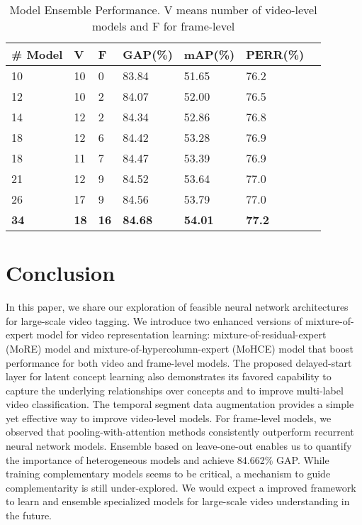 \documentclass[10pt,twocolumn,letterpaper]{article}
\begin{document}
\begin{table}[]
\centering
\caption{Model Ensemble Performance. V means number of video-level models and F for frame-level}
\label{ensemble_peroformance}
\begin{tabular}{lllllll}
\# Model & V & F &GAP(\%) & mAP(\%) & PERR(\%) \\ \hline \hline
10 & 10 & 0 & 83.84 & 51.65 & 76.2 \\
12 & 10 & 2 & 84.07 & 52.00 & 76.5 \\
14 & 12 & 2 & 84.34 & 52.86 &  76.8 \\
18 & 12 & 6 & 84.42 & 53.28 & 76.9 \\
18 & 11 & 7 & 84.47 & 53.39 & 76.9 \\
21 & 12 & 9 & 84.52 & 53.64 & 77.0 \\
26 & 17 & 9 & 84.56 & 53.79 & 77.0 \\
\textbf{34} & \textbf{18} & \textbf{16} & \textbf{84.68} & \textbf{54.01} & \textbf{77.2} \\
\hline %
\end{tabular}
\end{table}


\section{Conclusion}
In this paper, we share our exploration of feasible neural network architectures for large-scale video tagging. We introduce two enhanced versions of mixture-of-expert model for video representation learning: mixture-of-residual-expert (MoRE) model and mixture-of-hypercolumn-expert (MoHCE) model that boost performance for both video and frame-level models. 
The proposed delayed-start layer for latent concept learning also demonstrates its favored capability to capture the underlying relationships over concepts and to improve multi-label video classification. The temporal segment data augmentation provides a simple yet effective way to improve video-level models. For frame-level models, we observed that pooling-with-attention methods consistently outperform recurrent neural network models. Ensemble based on leave-one-out  enables us to quantify the importance of heterogeneous models and achieve 84.662\% GAP. While training complementary models seems to be critical, a mechanism to guide complementarity is still under-explored. We would expect a improved framework to learn and ensemble specialized models for large-scale video understanding in the future.
\end{document}
